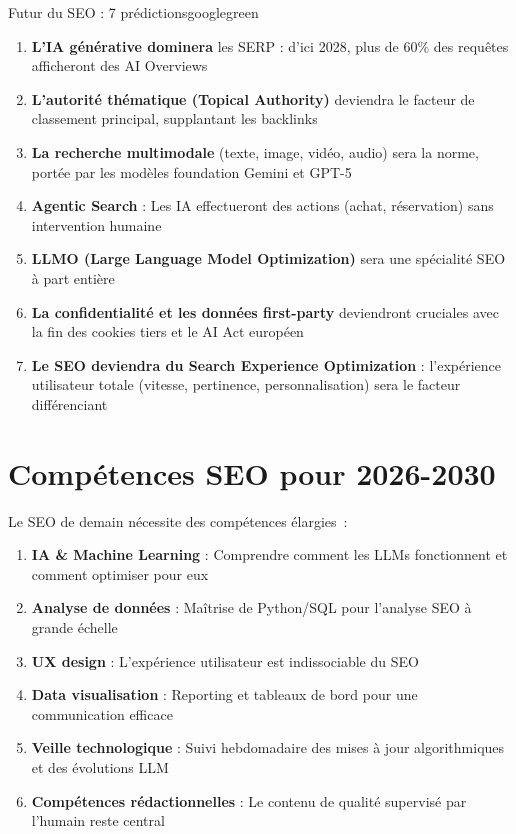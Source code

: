 \documentclass[12pt,a4paper,twoside]{report}
\begin{document}
\begin{mybox}{Futur du SEO : 7 prédictions}{googlegreen}
\begin{enumerate}
    \item \textbf{L'IA générative dominera} les SERP : d'ici 2028, plus de 60\% des requêtes afficheront des AI Overviews
    \item \textbf{L'autorité thématique (Topical Authority)} deviendra le facteur de classement principal, supplantant les backlinks
    \item \textbf{La recherche multimodale} (texte, image, vidéo, audio) sera la norme, portée par les modèles foundation Gemini et GPT-5
    \item \textbf{Agentic Search} : Les IA effectueront des actions (achat, réservation) sans intervention humaine
    \item \textbf{LLMO (Large Language Model Optimization)} sera une spécialité SEO à part entière
    \item \textbf{La confidentialité et les données first-party} deviendront cruciales avec la fin des cookies tiers et le AI Act européen
    \item \textbf{Le SEO deviendra du Search Experience Optimization} : l'expérience utilisateur totale (vitesse, pertinence, personnalisation) sera le facteur différenciant
\end{enumerate}
\end{mybox}

\section{Compétences SEO pour 2026-2030}

Le SEO de demain nécessite des compétences élargies~:

\begin{enumerate}
    \item \textbf{IA \& Machine Learning} : Comprendre comment les LLMs fonctionnent et comment optimiser pour eux
    \item \textbf{Analyse de données} : Maîtrise de Python/SQL pour l'analyse SEO à grande échelle
    \item \textbf{UX design} : L'expérience utilisateur est indissociable du SEO
    \item \textbf{Data visualisation} : Reporting et tableaux de bord pour une communication efficace
    \item \textbf{Veille technologique} : Suivi hebdomadaire des mises à jour algorithmiques et des évolutions LLM
    \item \textbf{Compétences rédactionnelles} : Le contenu de qualité supervisé par l'humain reste central
\end{enumerate}
\end{document}
